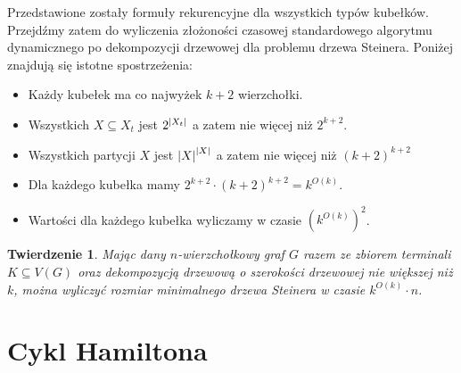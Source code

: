 \documentclass[12pt, oneside]{report}
\newtheorem{theorem}{Twierdzenie}
\newcommand\Omicron{O}
\begin{document}
Przedstawione zostały formuły rekurencyjne dla wszystkich typów kubełków. Przejdźmy zatem do wyliczenia złożoności czasowej standardowego algorytmu dynamicznego po dekompozycji drzewowej dla problemu drzewa Steinera. Poniżej znajdują się istotne spostrzeżenia:
\begin{itemize}
\item Każdy kubełek ma co najwyżek $k+2$ wierzchołki.
\item Wszystkich $X \subseteq X_t$ jest $2^{\abs{X_t}}$ a zatem nie więcej niż $2^{k+2}$.
\item Wszystkich partycji $X$ jest $\abs{X}^{\abs{X}}$ a zatem nie więcej niż $(k+2)^{k+2}$
\item Dla każdego kubełka mamy $2^{k+2} \cdot (k+2)^{k+2} = k^{\Omicron(k)}$.
\item Wartości dla każdego kubełka wyliczamy w czasie $(k^{\Omicron(k)})^2$.
\end{itemize}
 
\begin{theorem}
Mając dany $n$-wierzchołkowy graf $G$ razem ze zbiorem terminali $K \subseteq V(G)$ oraz dekompozycją drzewową o szerokości drzewowej nie większej niż $k$, można wyliczyć rozmiar minimalnego drzewa Steinera w czasie $k^{\Omicron(k)} \cdot n$. 
\end{theorem}

    	\section{Cykl Hamiltona}
    	
\end{document}
